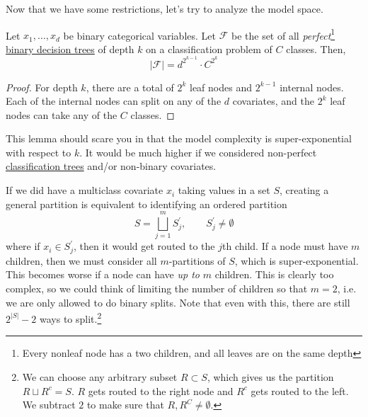   Now that we have some restrictions, let's try to analyze the model space.   

  \begin{lemma}
    \label{thm:set-of-all-full-trees-of-a-certain-depth}
    Let $x_1, \ldots, x_d$ be binary categorical variables. Let $\mathcal{F}$ be the set of all \textit{perfect}\footnote{Every nonleaf node has a two children, and all leaves are on the same depth} \hyperref[def:binary-decision-tree]{binary decision trees} of depth $k$ on a classification problem of $C$ classes. Then, 
    \begin{equation}
      |\mathcal{F}| = d^{2^{k-1}} \cdot C^{2^{k}}
    \end{equation}
  \end{lemma}
  \begin{proof}
    For depth $k$, there are a total of $2^k$ leaf nodes and $2^{k-1}$ internal nodes. Each of the internal nodes can split on any of the $d$ covariates, and the $2^k$ leaf nodes can take any of the $C$ classes. 
  \end{proof}

  This lemma should scare you in that the model complexity is super-exponential with respect to $k$. It would be much higher if we considered non-perfect \hyperref[def:classification-trees]{classification trees} and/or non-binary covariates. 

  \begin{example}
    \label{ex:max-subnodes-per-split}
    If we did have a multiclass covariate $x_i$ taking values in a set $S$, creating a general partition is equivalent to identifying an ordered partition 
    \begin{equation}
      S = \bigsqcup_{j=1}^m S^\prime_j, \qquad S^\prime_j \neq \emptyset
    \end{equation} 
    where if $x_i \in S^\prime_j$, then it would get routed to the $j$th child. If a node must have $m$ children, then we must consider all $m$-partitions of $S$, which is super-exponential. This becomes worse if a node can have \textit{up to} $m$ children. This is clearly too complex, so we could think of limiting the number of children so that $m = 2$, i.e. we are only allowed to do binary splits. Note that even with this, there are still $2^{|S|} - 2$ ways to split.\footnote{We can choose any arbitrary subset $R \subset S$, which gives us the partition $R \sqcup R^c = S$. $R$ gets routed to the right node and $R^c$ gets routed to the left. We subtract $2$ to make sure that $R, R^C \neq \emptyset$.}
  \end{example}

